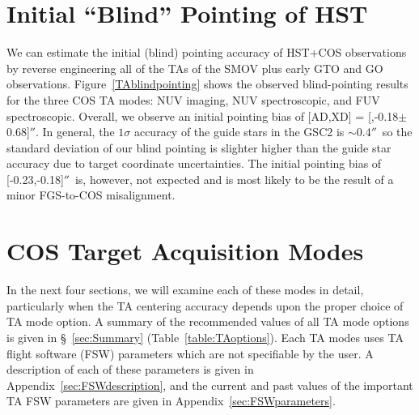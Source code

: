 \documentclass[12pt]{article}
\newcommand{\arcsec}{\ensuremath{''}}
\newcommand{\blindxd}{-0.18$\pm$0.68}
\begin{document}
\section{Initial ``Blind'' Pointing of HST}\label{sec:IP}
\vspace{-0.3cm}
We can estimate the initial (blind) pointing accuracy of HST+COS
observations by reverse engineering all of the TAs of the SMOV plus early
GTO and GO observations. Figure~\ref{TAblindpointing} shows the observed blind-pointing results for the three COS TA modes: NUV imaging, NUV spectroscopic, and FUV spectroscopic.
Overall, we observe an initial pointing bias of [AD,XD] = [\blindad,\blindxd]\arcsec.
In general, the $1\sigma$ accuracy of the guide stars in the GSC2 is $\sim$0.4\arcsec\,
so the standard deviation of our blind pointing is slighter higher than the guide star accuracy due to target coordinate uncertainties.
The initial pointing bias of [-0.23,-0.18]\arcsec\ is, however, not expected and is most likely to be the result of a minor FGS-to-COS misalignment.

\clearpage
\vspace{-0.6cm}
\section{COS Target Acquisition Modes}

In the next four sections, we will examine each of these modes in detail,
particularly when the TA centering accuracy depends upon the proper choice
of TA mode option. A summary of the recommended values of all TA mode options is given in \S~\ref{sec:Summary} (Table~\ref{table:TAoptions}). Each TA modes uses TA flight software (FSW) parameters which are not specifiable by the user. A description of each of these parameters is given in Appendix~\ref{sec:FSWdescription},
and the current and past values of the important TA FSW parameters are given in Appendix~\ref{sec:FSWparameters}.
\end{document}
